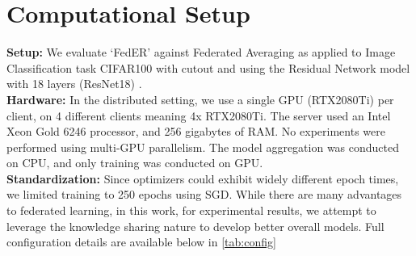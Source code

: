 \section{Computational Setup}
\textbf{Setup:} We evaluate `FedER' against Federated Averaging \cite{konevcny2016federated} as applied to Image Classification task CIFAR100 with cutout and using the Residual Network model with 18 layers (ResNet18)  \cite{he2016deep}. \\

\textbf{Hardware:} In the distributed setting, we use a single GPU (RTX2080Ti) per client, on 4 different clients meaning 4x RTX2080Ti. The server used an Intel Xeon Gold 6246 processor, and 256 gigabytes of RAM. No experiments were performed using multi-GPU parallelism. The model aggregation was conducted on CPU, and only training was conducted on GPU.\\

\textbf{Standardization:} Since optimizers could exhibit widely different epoch times, we limited training to 250 epochs using SGD. While there are many advantages to federated learning, in this work, for experimental results, we attempt to leverage the knowledge sharing nature to develop better overall models. Full configuration details are available below in \autoref{tab:config}\\

